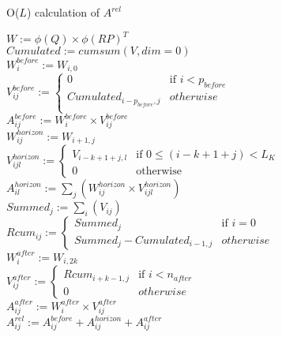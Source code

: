 \begin{algorithm}[!ht]
	\small
	\caption{O($L$) calculation of $A^{rel}$}
	\label{alg:A_rel}
	\vskip12pt
	\vskip12pt
	\vskip12pt
	$W := \phi(Q) \times \phi(RP)^T$\\
	$Cumulated := cumsum(V, dim=0)$\\
	$W^{before}_{i} := W_{i,0}$\\
	$V^{before}_{ij} := 
	\begin{cases}
		0 & \text{if }i < p_{before}\\
		Cumulated_{i-p_{before}, j} & otherwise\\
	\end{cases}$\\
	$A^{before}_{ij} := W^{before}_{i} \times V^{before}_{ij}$\\
	$W^{horizon}_{ij} := W_{i+1,j}$\\
	$V^{horizon}_{ijl} :=
	\begin{cases}
		V_{i-k+1+j, l} & \text{if }0 \leq (i-k+1+j) < L_K\\
		0 & \text{otherwise} 
	\end{cases}$\\
	$A^{horizon}_{il} := \sum_j \left( W^{horizon}_{ij} \times V^{horizon}_{ijl} \right)$\\
	$Summed_{j} := \sum_i \left( V_{ij}\right)$\\
	$Rcum_{ij} := 
	\begin{cases}
		Summed_{j} & \text{if }i=0\\
		Summed_{j} - Cumulated_{i-1,j} & otherwise
	\end{cases}$\\
	$W^{after}_{i} := W_{i, 2k}$\\
	$V^{after}_{ij} := 
	\begin{cases}
		Rcum_{i+k-1,j} & \text{if }i<n_{after}\\
		0 & otherwise
	\end{cases}$\\
	$A^{after}_{ij} := W^{after}_{i} \times V^{after}_{ij}$\\
	$A^{rel}_{ij} := A^{before}_{ij} + A^{horizon}_{ij} + A^{after}_{ij}$
\end{algorithm}

\endinput